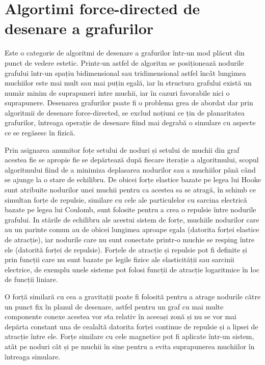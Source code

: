 \newpage
\section{Algortimi force-directed de desenare a grafurilor}

Este o categorie de algoritmi de desenare a grafurilor într-un mod plăcut din punct de vedere estetic. 
Printr-un astfel de algoritm se posiționează nodurile grafului într-un spațiu bidimensional sau tridimensional astfel încât 
lungimea muchiilor este mai mult sau mai puțin egală, iar în structura grafului există un număr minim de suprapuneri intre muchii, 
iar în cazuri favorabile nici o suprapunere. Desenarea grafurilor poate fi o problema grea de abordat dar prin algoritmii 
de desenare force-directed, se exclud noțiuni ce țin de planaritatea grafurilor, întreaga operație de desenare fiind mai 
degrabă o simulare cu aspecte ce se regăsesc în fizică.\newline

Prin asignarea anumitor foțe setului de noduri și setului de muchii din graf acestea fie se apropie fie se depărtează după 
fiecare iterație a algoritmului, scopul algoritmului fiind de a minimiza deplasarea nodurilor sau a muchiilor până când se 
ajunge la o stare de echilibru. De obicei forțe elastice bazate pe legea lui Hooke sunt atribuite nodurilor unei muchii 
pentru ca acestea sa se atragă, în schimb ce simultan forțe de repulsie, similare cu cele ale particulelor cu sarcina electrică 
bazate pe legea lui Coulomb, sunt folosite pentru a crea o repulsie între nodurile grafului. In stările de echilibru ale acestui sistem de forțe, 
muchiile nodurilor care au un parinte comun au de obicei lungimea aproape egala (datorita forței elastice de atracție), 
iar nodurile care nu sunt conectate printr-o muchie se resping între ele (datorită forței de repulsie). Forțele de atracție și repulsie pot fi definite și prin funcții 
care nu sunt bazate pe legile fizice ale elasticității sau sarcinii electrice, de exemplu unele sisteme pot folosi funcții de 
atracție logaritmice în loc de funcții liniare.\newline

O forță similară cu cea a gravitații poate fi folosită pentru a atrage nodurile către un punct fix în planul de desenare, 
astfel pentru un graf cu mai multe componente conexe acestea vor sta relativ în aceeași zonă și nu se vor mai depărta 
constant una de cealaltă datorita forței continue de repulsie și a lipsei de atracție între ele. Forțe similare cu cele 
magnetice pot fi aplicate într-un sistem, atât pe noduri cât și pe muchii în sine pentru a evita suprapunerea muchiilor 
în întreaga simulare.\newline

